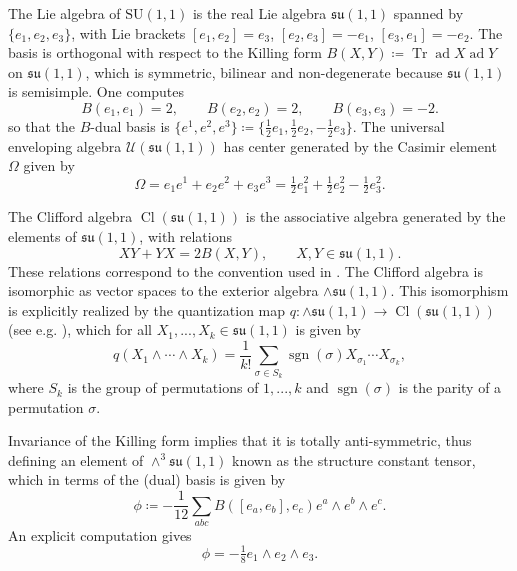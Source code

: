 \documentclass{amsart}
\theoremstyle{definition}
\theoremstyle{remark}
\DeclareMathOperator{\ad}{ad}
\DeclareMathOperator{\Cl}{Cl}
\DeclareMathOperator{\sgn}{sgn}
\DeclareMathOperator{\Tr}{Tr}
\numberwithin{equation}{section}
\begin{document}
The Lie algebra of $\mathrm{SU}(1,1)$ is the real Lie algebra $\mathfrak{su}(1,1)$ spanned by $\{e_1,e_2,e_3\}$, with Lie brackets $[e_1,e_2]=e_3$, $[e_2,e_3]=-e_1$, $[e_3,e_1]=-e_2$. The basis is orthogonal with respect to the Killing form $B(X,Y)\coloneq\Tr\ad X\ad Y$ on $\mathfrak{su}(1,1)$, which is symmetric, bilinear and non-degenerate because $\mathfrak{su}(1,1)$ is semisimple. One computes
\begin{equation*}
    B(e_1,e_1)=2,\qquad B(e_2,e_2)=2,\qquad B(e_3,e_3)=-2.
\end{equation*}
so that the $B$-dual basis is $\{e^1,e^2,e^3\}\coloneq\{\tfrac{1}{2}e_1,\tfrac{1}{2}e_2,-\tfrac{1}{2}e_3\}$. The universal enveloping algebra $\mathcal{U}(\mathfrak{su}(1,1))$ has center generated by the Casimir element $\Omega$ given by
\begin{equation*}
    \Omega=e_1e^1+e_2e^2+e_3e^3=\tfrac{1}{2}e_1^2+\tfrac{1}{2}e_2^2-\tfrac{1}{2}e_3^2.
\end{equation*}

The Clifford algebra $\Cl(\mathfrak{su}(1,1))$ is the associative algebra generated by the elements of $\mathfrak{su}(1,1)$, with relations
\begin{equation*}
    XY+YX=2B(X,Y),\qquad X,Y\in\mathfrak{su}(1,1).
\end{equation*}
These relations correspond to the convention used in \cite{meinrenken_2013}. The Clifford algebra is isomorphic as vector spaces to the exterior algebra $\wedge\mathfrak{su}(1,1)$. This isomorphism is explicitly realized by the quantization map $q\colon\wedge\mathfrak{su}(1,1)\rightarrow \Cl(\mathfrak{su}(1,1))$ (see e.g. \cite[prop. 2.7]{meinrenken_2013}), which for all $X_1,...,X_k\in\mathfrak{su}(1,1)$ is given by
\begin{equation*}
    q(X_1\wedge\cdots\wedge X_k)=\frac{1}{k!}\sum_{\sigma\in S_k}\sgn(\sigma)X_{\sigma_1}\cdots X_{\sigma_k},
\end{equation*}
where $S_k$ is the group of permutations of $1,...,k$ and $\sgn(\sigma)$ is the parity of a permutation $\sigma$.

Invariance of the Killing form implies that it is totally anti-symmetric, thus defining an element of $\wedge^3\mathfrak{su}(1,1)$ known as the structure constant tensor, which in terms of the (dual) basis is given by
\begin{equation*}
    \phi\coloneq-\frac{1}{12}\sum_{abc}B([e_a,e_b],e_c)e^a\wedge e^b\wedge e^c.
\end{equation*}
An explicit computation gives 
\begin{equation}
    \phi=-\tfrac{1}{8}e_1\wedge e_2\wedge e_3.
\end{equation}
\end{document}

